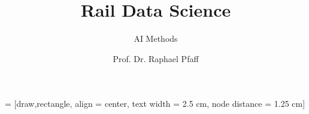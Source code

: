 \documentclass[slidestop,compress,mathserif, aspectratio = 169]{beamer}
\begin{document}
 = [draw,rectangle, align = center, text width = 2.5 cm, node distance = 1.25 cm]

\newcommand{\Var}{\operatorname{Var}}
\newcommand{\mum}{\operatorname{\mu m}}
\newcommand{\E}{\operatorname{E}}
\newcommand{
\offslide}[2]{
\begin{frame}
\frametitle{\includegraphics[scale=0.05] {Offwhite} \hspace{.5mm} #1}
\begin{tikzpicture}[x=1cm, y=1cm, semitransparent]
\draw[step=5mm, line width=0.2mm, black!40!white] (0,0) grid (\textwidth,\textheight-1cm);
\node[anchor = south east] at (\textwidth,0) {#2};

\end{tikzpicture}
\end{frame}
}
\newcommand{\source}[1]{\rotatebox{90}{\tiny \color{gray} #1}}

\newcommand{\lehrtext}[1]{
\only<article>{
\vspace{0.3cm}
\leavevmode%
  \tabto*{-1.8cm}%
  \smash{\belowbaseline[-\ht\strutbox]{\makebox[0pt]%
    [l]%
  {\texttt{[image: teacher]}}}}%
  \tabto*{\TabPrevPos}%
#1
}
}

\title{Rail Data Science}
\subtitle{AI Methods}
\author{Prof. Dr. Raphael Pfaff}

\begin{frame} %
\titlepage
\end{frame}


\end{document}
